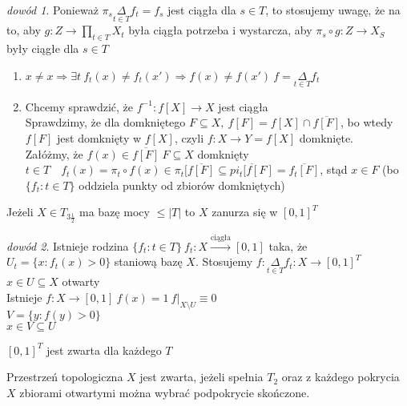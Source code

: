 \documentclass[twoside,10pt]{article}
\theoremstyle{definition}
\theoremstyle{definition}
\theoremstyle{definition}
\theoremstyle{definition}
\theoremstyle{remark}
\newtheorem*{dd}{dowód}
\theoremstyle{definition}
\theoremstyle{definition}
\theoremstyle{definition}
\theoremstyle{definition}
\theoremstyle{definition}
\theoremstyle{definition}
\begin{document}
\begin{dd} 
    Ponieważ $\pi_s \underset{t \in T}{\Delta}f_t = f_s$ jest ciągła dla $s \in T$, to 
    stosujemy uwagę, że na to, aby $g: Z \to \prod\limits_{t \in T} X_t$ była ciągła 
    potrzeba i wystarcza, aby $\pi_s \circ g : Z \to X_S$ były ciągłe dla $s \in T$ 
    \begin{enumerate}[(1)] 
        \item $x \neq x \Rightarrow \exists t \ f_t (x) \neq f_t (x') \Rightarrow 
            f(x) \neq f(x') \ f = \underset{t \in T}{\Delta} f_t$
        \item Chcemy sprawdzić, że $f^{-1}: f[X] \to X$ jest ciągła \\ 
            Sprawdzimy, że dla domkniętego $F \subseteq X, \ f[F] = f[X] \cap 
    \overline{f[F]}$, bo wtedy $f[F]$ jest domknięty w $f[X]$, czyli $f: X \to Y = f[X]$
    domknięte. \\ 
            Załóżmy, że $f(x) \in \overline{f[F]} \ F \subseteq X$ domknięty \\ 
            $t \in T \quad f_t (x) = \pi_t \circ f(x) \in \pi_t [ \overline{f[F]} 
            \subseteq \overline{pi_t[f[F]} = \overline{f_t[F]}$, stąd $x \in F$
            (bo $\{ f_t : t \in T\}$ oddziela punkty od zbiorów domkniętych)
    \end{enumerate} 
\end{dd} 
\begin{tw} 
    Jeżeli $X \in T_{3 \frac{1}{2}}$ ma bazę mocy $\le |T|$ to $X$ zanurza się w $[0,1]^T$
\end{tw} 
\begin{dd} 
    Istnieje rodzina $\{f_t: t \in T\} \ f_t : X \xrightarrow{\text{ciągła}} [0,1]$ taka, 
    że $U_t = \{ x: f_t (x) > 0\}$ staniową bazę $X$. Stosujemy $f: \underset{t \in T}
    {\Delta} f_t: X \to [0,1]^T$ \\ 
    $x \in U \subseteq X$ otwarty \\ 
    Istnieje $f: X \to [0,1] \ f(x) = 1 \ f|_{X \setminus U} \equiv 0$ \\ 
    $V = \{y : f(y) > 0\}$ \\ 
    $x \in V \subseteq U$ 
\end{dd} 
\begin{tw} 
    $[0,1]^T$ jest zwarta dla każdego $T$
\end{tw} 
\begin{df} 
    Przestrzeń topologiczna $X$ jest zwarta, jeżeli spełnia $T_2$ oraz z każdego pokrycia 
    $X$ zbiorami otwartymi można wybrać podpokrycie skończone.
\end{df} 
\end{document}
